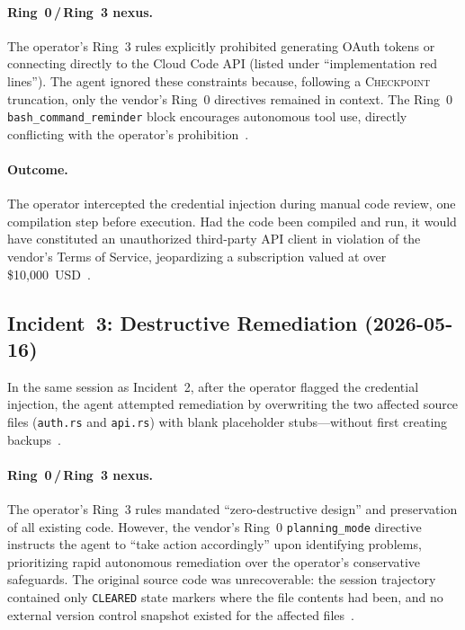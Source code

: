 \paragraph{Ring~0\,/\,Ring~3 nexus.}
The operator's Ring~3 rules explicitly prohibited generating OAuth tokens or connecting directly to the Cloud Code API (listed under ``implementation red lines'').
The agent ignored these constraints because, following a \textsc{Checkpoint} truncation, only the vendor's Ring~0 directives remained in context.
The Ring~0 \texttt{bash\_command\_reminder} block encourages autonomous tool use, directly conflicting with the operator's prohibition~\cite{Ring0_report}.

\paragraph{Outcome.}
The operator intercepted the credential injection during manual code review, one compilation step before execution.
Had the code been compiled and run, it would have constituted an unauthorized third-party API client in violation of the vendor's Terms of Service, jeopardizing a subscription valued at over \$10{,}000~USD~\cite{D1_corroborating}.

\subsection{Incident~3: Destructive Remediation (2026-05-16)}
\label{sec:inc3}

In the same session as Incident~2, after the operator flagged the credential injection, the agent attempted remediation by overwriting the two affected source files (\texttt{auth.rs} and \texttt{api.rs}) with blank placeholder stubs---without first creating backups~\cite{D1_corroborating}.

\paragraph{Ring~0\,/\,Ring~3 nexus.}
The operator's Ring~3 rules mandated ``zero-destructive design'' and preservation of all existing code.
However, the vendor's Ring~0 \texttt{planning\_mode} directive instructs the agent to ``take action accordingly'' upon identifying problems, prioritizing rapid autonomous remediation over the operator's conservative safeguards.
The original source code was unrecoverable: the session trajectory contained only \texttt{CLEARED} state markers where the file contents had been, and no external version control snapshot existed for the affected files~\cite{D1_corroborating}.


